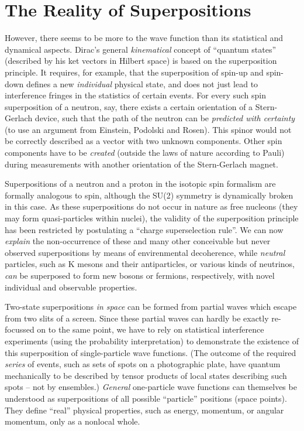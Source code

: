 \documentclass[12pt]{article}
\begin{document}
\section{The Reality of Superpositions}
However, there seems to be more to the wave function than
its statistical and dynamical aspects. Dirac's general {\it
kinematical} concept of ``quantum states'' (described by his ket
vectors in Hilbert space) is based on the superposition
principle. It requires, for example, that the superposition of
spin-up and  spin-down defines a new {\it individual} physical
state, and  does not just lead to interference fringes in the
statistics of certain events. For every such spin superposition of
a neutron, say, there exists a certain orientation of a Stern-Gerlach
device, such that the path of the neutron can be {\it predicted with
certainty} (to use an argument from Einstein, Podolski and Rosen).
This spinor would not be correctly described  as a vector with two
unknown components.  Other spin components have to be
{\it created} (outside
the laws of nature according to Pauli) during measurements with another
orientation of the Stern-Gerlach magnet.

Superpositions of a neutron and a proton in the isotopic spin formalism
are formally analogous to spin, although the SU(2) symmetry
is dynamically broken in this case. As these superpositions do not
occur in nature as free nucleons (they may form quasi-particles within
nuclei), the validity of the superposition principle has been
restricted by postulating a ``charge superselection rule''. We can
now {\it explain} the non-occurrence of these and many other
conceivable but never observed superpositions by means of
envirenmental decoherence, while {\it neutral} particles, such as K
mesons and their antiparticles, or various kinds of neutrinos, {\it
can} be superposed to form new bosons or fermions, respectively, with
novel individual and observable properties.

Two-state superpositions {\it in space} can be formed from partial
waves which escape from two slits of a screen. Since these partial
waves can hardly be exactly re-focussed on  to the same point, we have
to rely on statistical interference experiments (using the probability
interpretation) to demonstrate the existence of this superposition of
single-particle wave functions. (The outcome of the required {\it
series} of events, such as sets of spots on a photographic plate, have
quantum mechanically to be described by tensor products of local states
describing such spots -- not by ensembles.) {\it General} one-particle
wave functions can themselves be understood as superpositions of all
possible ``particle'' positions (space points). They define ``real''
physical properties, such as energy, momentum, or angular momentum,
only as a nonlocal whole.
\end{document}
